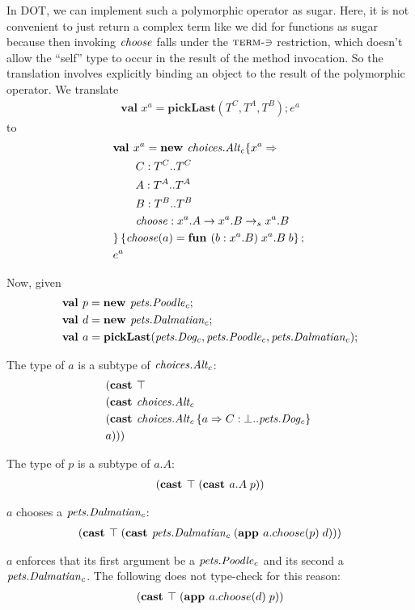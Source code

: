 \documentclass[9pt]{sigplanconf}
\begin{document}
In DOT, we can implement such a polymorphic operator as sugar. Here,
it is not convenient to just return a complex term like we did for
functions as sugar because then invoking $\mathit{choose}$ falls under the
$\textsc{term-$\ni$}$ restriction, which doesn't allow the ``self''
type to occur in the result of the method invocation. So the
translation involves explicitly binding an object to the result of the
polymorphic operator. We translate
\begin{align*}
\textbf{val } x^a = \textbf{pickLast}(T^C, T^A, T^B); e^a
\end{align*}
to
\begin{align*}
&\textbf{val }x^a = \textbf{new }\mathit{choices.Alt_c} \{x^a \Rightarrow \\
&\quad\quad C : T^C..T^C\\
&\quad\quad A : T^A..T^A\\
&\quad\quad B : T^B..T^B\\
&\quad\quad\mathit{choose} : x^a.A \rightarrow x^a.B\rightarrow_sx^a.B\\
& \}\left\{\mathit{choose}(a)=\textbf{fun } (b:x^a.B)\;x^a.B\;b\right\} ;\;\\&e^a
\end{align*}

Now, given
\begin{align*}
&\textbf{val }p = \textbf{new }\mathit{pets.Poodle_c} ;\;\\&\textbf{val }d = \textbf{new }\mathit{pets.Dalmatian_c} ;\;\\&\textbf{val } a = \textbf{pickLast}({\mathit{pets.Dog_c}}, {\mathit{pets.Poodle_c}}, {\mathit{pets.Dalmatian_c}});
\end{align*}

The type of $a$ is a subtype of ${\mathit{choices.Alt_c}}$:
\begin{align*}
&(\textbf{cast }\top\;\\
&(\textbf{cast }\mathit{choices.Alt_c}\;\\
&(\textbf{cast }{\mathit{choices.Alt_c}} \left\{a \Rightarrow C : \bot..\mathit{pets.Dog_c} \right\}\;\\
&a)))
\end{align*}

The type of $p$ is a subtype of $a.A$:
\begin{align*}
(\textbf{cast }\top\;(\textbf{cast }a.A\;p))
\end{align*}

$a$ chooses a $\mathit{pets.Dalmatian_c}$:
\begin{align*}
(\textbf{cast }\top\;(\textbf{cast }\mathit{pets.Dalmatian_c}\;(\textbf{app }a.choose(p)\;d)))
\end{align*}

$a$ enforces that its first argument be a $\mathit{pets.Poodle_c}$ and its second a $\mathit{pets.Dalmatian_c}$. The following does not type-check for this reason:
\begin{align*}
(\textbf{cast }\top\;(\textbf{app }a.choose(d)\;p))
\end{align*}
\end{document}
